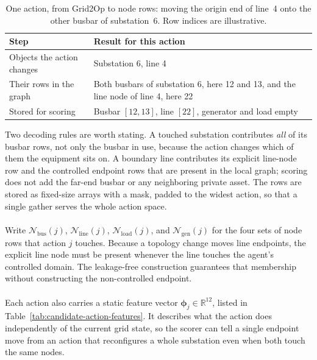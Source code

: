 \begin{table}[H]
  \centering
  \small
  \caption{One action, from Grid2Op to node rows: moving the origin end of
  line~4 onto the other busbar of substation~6. Row indices are illustrative.}
  \label{tab:candidate-metadata-example}
  \setlength{\tabcolsep}{5pt}
  \begin{tabular}{L{0.28\textwidth}L{0.62\textwidth}}
    \toprule
    Step & Result for this action \\
    \midrule
    Objects the action changes & Substation 6, line 4 \\
    Their rows in the graph & Both busbars of substation 6, here 12 and 13, and the line node of line 4, here 22 \\
    Stored for scoring & Busbar $[12,13]$, line $[22]$, generator and load empty \\
    \bottomrule
  \end{tabular}
\end{table}

\noindent Two decoding rules are worth stating. A touched substation contributes
\emph{all} of its busbar rows, not only the busbar in use, because the action
changes which of them the equipment sits on. A boundary line contributes its
explicit line-node row and the controlled endpoint rows that are present in the
local graph; scoring does not add the far-end busbar or any neighboring private
asset. The rows are stored as fixed-size arrays with a mask, padded to the
widest action, so that a single gather serves the whole action space.
\\
\\
Write $\mathcal{N}_{\mathrm{bus}}(j)$, $\mathcal{N}_{\mathrm{line}}(j)$,
$\mathcal{N}_{\mathrm{load}}(j)$, and $\mathcal{N}_{\mathrm{gen}}(j)$ for the
four sets of node rows that action $j$ touches. Because a topology change moves
line endpoints, the explicit line node must be present whenever the line
touches the agent's controlled domain. The leakage-free construction guarantees
that membership without constructing the non-controlled endpoint.
\\
\\
Each action also carries a static feature vector
$\boldsymbol{\phi}_j\in\mathbb{R}^{12}$, listed in
Table~\ref{tab:candidate-action-features}. It describes what the action does
independently of the current grid state, so the scorer can tell a single
endpoint move from an action that reconfigures a whole substation even when
both touch the same nodes.

